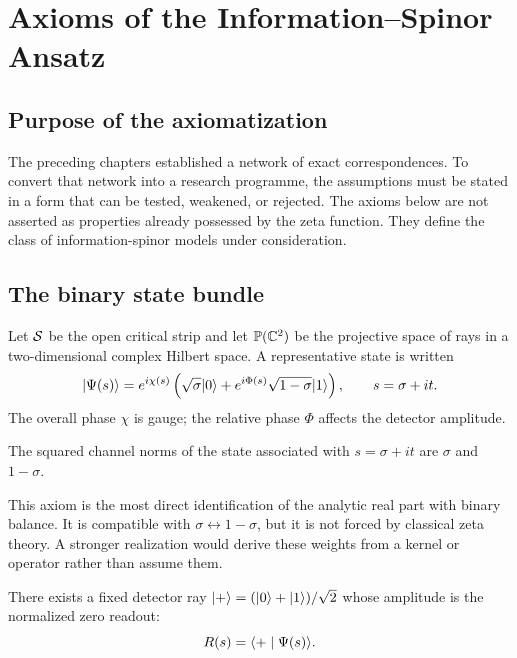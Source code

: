 \chapter{Axioms of the Information--Spinor Ansatz}
\label{chap:axioms}

\section{Purpose of the axiomatization}

The preceding chapters established a network of exact correspondences. To convert that network into a research programme, the assumptions must be stated in a form that can be tested, weakened, or rejected. The axioms below are not asserted as properties already possessed by the zeta function. They define the class of information-spinor models under consideration.

\section{The binary state bundle}

Let $\mathcal{S}$ be the open critical strip and let $\mathbb P(\mathbb{C}^2)$ be the projective space of rays in a two-dimensional complex Hilbert space. A representative state is written
\begin{equation}
 \lvert \Psi(s)\rangle
 =e^{i\chi(s)}\left(
 \sqrt{\sigma}\lvert 0\rangle
 +e^{i\Phi(s)}\sqrt{1-\sigma}\lvert 1\rangle
 \right),
 \qquad s=\sigma+it.
 \label{eq:ansatz-state}
\end{equation}
The overall phase $\chi$ is gauge; the relative phase $\Phi$ affects the detector amplitude.

\begin{axiom}
\label{ax:weights}
The squared channel norms of the state associated with $s=\sigma+it$ are $\sigma$ and $1-\sigma$.
\end{axiom}

This axiom is the most direct identification of the analytic real part with binary balance. It is compatible with $\sigma\leftrightarrow1-\sigma$, but it is not forced by classical zeta theory. A stronger realization would derive these weights from a kernel or operator rather than assume them.

\begin{axiom}
\label{ax:detector}
There exists a fixed detector ray $\lvert +\rangle=(\lvert 0\rangle+\lvert 1\rangle)/\sqrt2$ whose amplitude is the normalized zero readout:
\begin{equation}
 R(s)=\langle +\mid \Psi(s)\rangle.
 \label{eq:readout}
\end{equation}
\end{axiom}

